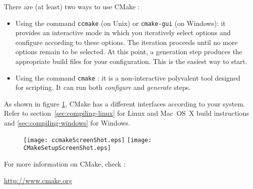 There are (at least) two ways to use CMake :
\begin{itemize}
\item Using the command \texttt{ccmake} (on Unix) or \texttt{cmake-gui} (on Windows): 
it provides an interactive mode in which you iteratively select
options and configure according to these options. The iteration
proceeds until no more options remain to be selected. At this point, a
generation step produces the appropriate build files for your
configuration. This is the easiest way to start.
\item Using the command \texttt{cmake} : it is a non-interactive polyvalent tool designed for scripting. It can run both \textit{configure} and \textit{generate} steps.
\end{itemize}

As shown in figure \ref{fig:CMakeGUI}, CMake has a different interfaces according to your system.
Refer to section~\ref{sec:compiling-linux} for Linux and Mac~OS~X build instructions
and \ref{sec:compiling-windows} for Windows.

\begin{figure}[tpb]
\centering
\texttt{[image: ccmakeScreenShot.eps]}
\texttt{[image: CMakeSetupScreenShot.eps]}
\label{fig:CMakeGUI}
\end{figure}

For more information on CMake, check :
\begin{center}
\url{http://www.cmake.org}
\end{center}

